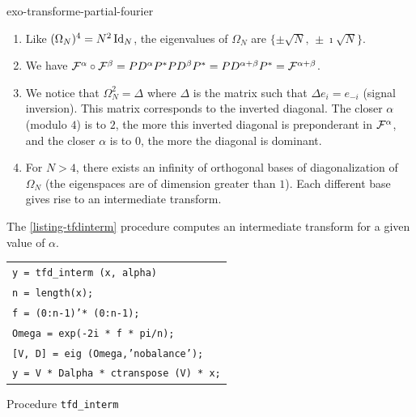  
\begin{correction}{exo-transforme-partial-fourier}
\begin{enumerate}
\item Like $ (\Omega_N)^4 = N^2 \operatorname{Id}_N $, the eigenvalues of $ \Omega_N $ are $ \{\pm \sqrt{N}, \, \pm \imath \sqrt{N}\} $.
\item We have $ \mathcal{F}^{\alpha} \circ \mathcal{F}^{\beta} = PD^{\alpha} P^{*} PD^{\beta} P^{*} = PD^{\alpha + \beta} P^{*} = \mathcal{F}^{\alpha + \beta} $.
\item We notice that $ \Omega_N^2 = \Delta $ where $ \Delta $ is the matrix such that $ \Delta e_i = e_{- i} $ (signal inversion). This matrix corresponds to the inverted diagonal. The closer $ \alpha $ (modulo $ 4 $) is to $ 2 $, the more this inverted diagonal is preponderant in $ \mathcal{F}^\alpha $, and the closer $ \alpha $ is to $ 0 $, the more the diagonal is dominant.
\item For $ N> 4 $, there exists an infinity of orthogonal bases of diagonalization of $ \Omega_N $ (the eigenspaces are of dimension greater than $ 1 $). Each different base gives rise to an intermediate transform.
\end{enumerate} The \Matlab{} \ref{listing-tfdinterm} procedure computes an intermediate transform for a given value of $ \alpha $.

\begin{listing} \begin{footnotesize}
{\upshape
\begin{tabular}{l} \texttt{\pfunction y = tfd\_interm (x, alpha)} \\
\texttt{n = length(x);} \\
\texttt{f = (0:n-1)'* (0:n-1);} \\
\texttt{Omega = exp(-2i * f * pi/n);} \\
\texttt{[V, D] = eig (Omega,'nobalance');} \\
\texttt{y = V * D{\hatverb}alpha * ctranspose (V) * x;} \\
\end{tabular}
} 
\end{footnotesize}
\caption{Procedure \texttt{\upshape tfd\_interm}}
\label{listing-tfdinterm}
\end{listing}
\end{correction}
 
